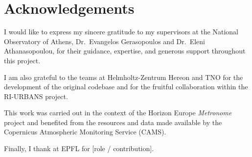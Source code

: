 
\chapter*{Acknowledgements}


I would like to express my sincere gratitude to my supervisors at the National
Observatory of Athens, Dr.\ Evangelos Gerasopoulos and Dr.\ Eleni Athanasopoulou,
for their guidance, expertise, and generous support throughout this project.

I am also grateful to the teams at Helmholtz-Zentrum Hereon and TNO for the
development of the original \urbem{} codebase and for the fruitful collaboration
within the RI-URBANS project.

This work was carried out in the context of the Horizon Europe \textit{Metronome}
project and benefited from the resources and data made available by the
Copernicus Atmospheric Monitoring Service (CAMS).

Finally, I thank \supervisorEPFL{} at EPFL for [role / contribution].
